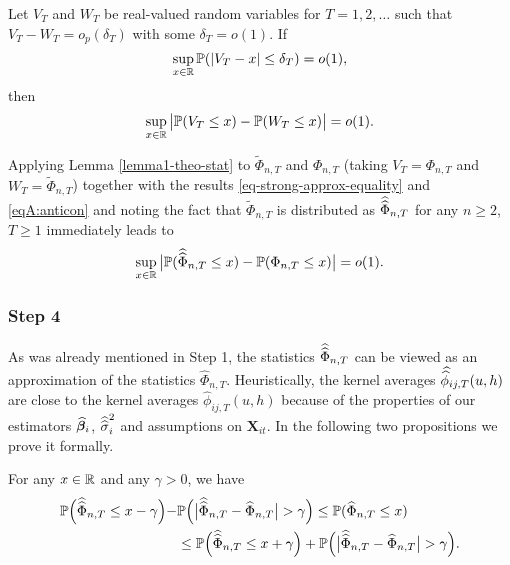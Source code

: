 \begin{lemmaA}{\cite{KhismatullinaVogt2020}}\label{lemma1-theo-stat}
Let $V_T$ and $W_T$ be real-valued random variables for $T = 1,2,\ldots$ such that $V_T - W_T = o_p(\delta_T)$ with some $\delta_T = o(1)$. If 
\begin{equation*}
\sup_{x \in \mathbb{R}} \mathbb{P}(|V_T - x| \le \delta_T) = o(1), 
\end{equation*}
then 
\begin{equation*}
\sup_{x \in \mathbb{R}} \big| \mathbb{P}(V_T \le x) - \mathbb{P}(W_T \le x) \big| = o(1). 
\end{equation*}
\end{lemmaA}

Applying Lemma \ref{lemma1-theo-stat} to $\widetilde{\Phi}_{n, T}$ and $\Phi_{n,T}$ (taking $V_T = \Phi_{n,T}$ and $W_T = \widetilde{\Phi}_{n, T}$) together with the results \eqref{eq-strong-approx-equality} and \eqref{eqA:anticon} and noting the fact that $\widetilde{\Phi}_{n, T}$ is distributed as $\widehat{\widehat{\Phi}}_{n, T}$ for any $n \ge 2$, $T \ge 1$ immediately leads to
\begin{equation}\label{eqA:intermediate:gaussian}
\sup_{x \in \mathbb{R}} \big| \mathbb{P}(\widehat{\widehat{\Phi}}_{n, T} \le x) - \mathbb{P}(\Phi_{n,T} \le x) \big| = o(1). 
\end{equation}

\subsubsection*{Step 4}


As was already mentioned in Step 1, the statistics $\widehat{\widehat{\Phi}}_{n,T}$ can be viewed as an approximation of the statistics $\widehat{\Phi}_{n,T}$. Heuristically, the kernel averages $\doublehat{\phi}_{ij,T}(u,h)$ are close to the kernel averages $\widehat{\phi}_{ij,T}(u,h)$ because of the properties of our estimators $\widehat{\bm{\beta}}_i$, $\widehat{\widehat{\sigma}}_i^2$ and assumptions on $\mathbf{X}_{it}$. In the following two propositions we prove it formally.

\begin{propA}\label{propA:intermediate1}
For any $x \in \mathbb{R}$ and any $\gamma > 0$, we have
\begin{align}\label{eq-intermediate-relation-1}
\begin{split}\mathbb{P}\Big(\widehat{\widehat{\Phi}}_{n,T} \le x - \gamma\Big) -& \mathbb{P} \Big(\big|\widehat{\widehat{\Phi}}_{n,T} - \widehat{\Phi}_{n,T}\big| > \gamma \Big)\le \mathbb{P}(\widehat{\Phi}_{n, T} \le x) \\
&\le\mathbb{P}\Big(\widehat{\widehat{\Phi}}_{n,T} \le x + \gamma\Big) + \mathbb{P} \Big(\big|\widehat{\widehat{\Phi}}_{n,T} - \widehat{\Phi}_{n,T}\big| > \gamma \Big).
\end{split}
\end{align}
\end{propA}

